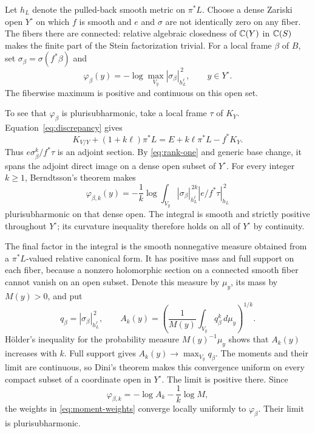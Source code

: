Let \(h_L\) denote the pulled-back smooth metric on \(\pi^*L\).
Choose a dense Zariski open \(Y^\circ\) on which \(f\) is smooth
and \(e\) and \(\sigma\) are not identically zero on any fiber.
The fibers there are connected: relative algebraic closedness of
\(\mathbb C(Y)\) in \(\mathbb C(S)\) makes the finite part of the Stein
factorization trivial. For a local frame \(\beta\) of \(B\), set
\(\sigma_\beta=\sigma(f^*\beta)\) and
\begin{equation}\label{eq:max-weight}
\varphi_\beta(y)=-\log\max_{V_y}
|\sigma_\beta|_{h_L^\ell}^{\,2},\qquad y\in Y^\circ.
\end{equation}
The fiberwise maximum is positive and continuous on this open set.

To see that \(\varphi_\beta\) is plurisubharmonic, take a local
frame \(\tau\) of \(K_Y\). Equation~\eqref{eq:discrepancy} gives
\begin{equation}\label{eq:adjoint}
K_{V/Y}+(1+k\ell)\pi^*L
=E+k\ell\pi^*L-f^*K_Y.
\end{equation}
Thus \(e\sigma_\beta^k/f^*\tau\) is an adjoint section. By
\eqref{eq:rank-one} and generic base change, it spans the adjoint
direct image on a dense open subset of \(Y^\circ\). For every
integer \(k\ge1\), Berndtsson's theorem makes
\begin{equation}\label{eq:moment-weights}
\varphi_{\beta,k}(y)
=-\frac1k\log\int_{V_y}
|\sigma_\beta|_{h_L^\ell}^{\,2k}
\left|e/f^*\tau\right|_{h_L}^{\,2}
\end{equation}
plurisubharmonic on that dense open. The integral is smooth and
strictly positive throughout \(Y^\circ\); its curvature inequality
therefore holds on all of \(Y^\circ\) by continuity.

The final factor in the integral is the smooth nonnegative measure
obtained from a \(\pi^*L\)-valued relative canonical form. It has
positive mass and full support on each fiber, because a nonzero
holomorphic section on a connected smooth fiber cannot vanish on an
open subset. Denote this measure by \(\mu_y\), its mass by
\(M(y)>0\), and put
\[
q_\beta=|\sigma_\beta|_{h_L^\ell}^{\,2},\qquad
A_k(y)=\left(\frac1{M(y)}\int_{V_y}q_\beta^k\,d\mu_y\right)^{1/k}.
\]
H\"older's inequality for the probability measure \(M(y)^{-1}\mu_y\)
shows that \(A_k(y)\) increases with \(k\). Full support gives
\(A_k(y)\to\max_{V_y}q_\beta\). The moments and their limit are
continuous, so Dini's theorem makes this convergence uniform on every
compact subset of a coordinate open in \(Y^\circ\). The limit is
positive there. Since
\[
\varphi_{\beta,k}=-\log A_k-\frac1k\log M,
\]
the weights in \eqref{eq:moment-weights} converge locally uniformly to
\(\varphi_\beta\). Their limit is plurisubharmonic.

